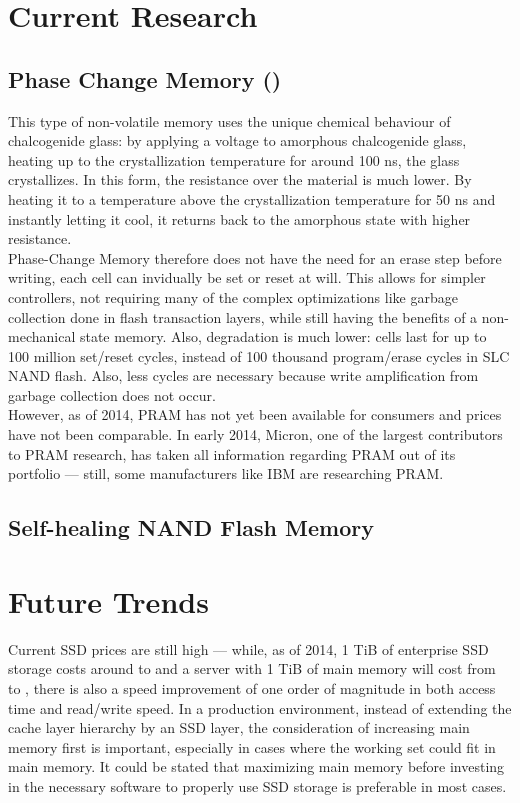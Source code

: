 \documentclass{acm_proc_article-sp}
\begin{document}
\section{Current Research}

\subsection{Phase Change Memory ()}
This type of non-volatile memory uses the unique chemical behaviour of chalcogenide glass: by applying a voltage to amorphous chalcogenide glass, heating up to the crystallization temperature for around 100 ns, the glass crystallizes. In this form, the resistance over the material is much lower. By heating it to a temperature above the crystallization temperature for 50 ns and instantly letting it cool, it returns back to the amorphous state with higher resistance.
\\
Phase-Change Memory therefore does not have the need for an erase step before writing, each cell can invidually be set or reset at will. This allows for simpler controllers, not requiring many of the complex optimizations like garbage collection done in flash transaction layers, while still having the benefits of a non-mechanical state memory. Also, degradation is much lower: cells last for up to 100 million set/reset cycles, instead of 100 thousand program/erase cycles in SLC NAND flash. Also, less cycles are necessary because write amplification from garbage collection does not occur.
\\
However, as of 2014, PRAM has not yet been available for consumers and prices have not been comparable. In early 2014, Micron, one of the largest contributors to PRAM research, has taken all information regarding PRAM out of its portfolio --- still, some manufacturers like IBM are researching PRAM.

\subsection{Self-healing NAND Flash Memory}
\cite{wu2011exploiting}
\cite{chen2013dheating}

\section{Future Trends}
Current SSD prices are still high --- while, as of 2014, 1 TiB of enterprise SSD storage costs around  to  and a server with 1 TiB of main memory will cost from  to , there is also a speed improvement of one order of magnitude in both access time and read/write speed. In a production environment, instead of extending the cache layer hierarchy by an SSD layer, the consideration of increasing main memory first is important, especially in cases where the working set could fit in main memory. It could be stated that maximizing main memory before investing in the necessary software to properly use SSD storage is preferable in most cases.
\end{document}
